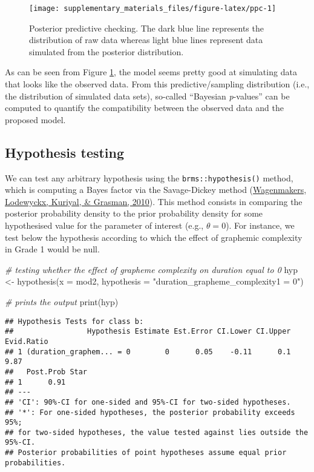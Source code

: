 \documentclass[
  11pt,
  english,
  ,doc,floatsintext]{apa6}
\newenvironment{Shaded}{}{}
\newcommand{\AttributeTok}[1]{\textcolor[rgb]{0.49,0.56,0.16}{#1}}
\newcommand{\CommentTok}[1]{\textcolor[rgb]{0.38,0.63,0.69}{\textit{#1}}}
\newcommand{\FunctionTok}[1]{\textcolor[rgb]{0.02,0.16,0.49}{#1}}
\newcommand{\NormalTok}[1]{#1}
\newcommand{\OtherTok}[1]{\textcolor[rgb]{0.00,0.44,0.13}{#1}}
\newcommand{\StringTok}[1]{\textcolor[rgb]{0.25,0.44,0.63}{#1}}
\begin{document}
\begin{figure}[!htb]

{\centering \texttt{[image: supplementary\_materials\_files/figure-latex/ppc-1]} 

}

\caption{Posterior predictive checking. The dark blue line represents the distribution of raw data whereas light blue lines represent data simulated from the posterior distribution.}\label{fig:ppc}
\end{figure}

As can be seen from Figure \ref{fig:ppc}, the model seems pretty good at simulating data that looks like the observed data. From this predictive/sampling distribution (i.e., the distribution of simulated data sets), so-called ``Bayesian \emph{p}-values'' can be computed to quantify the compatibility between the observed data and the proposed model.

\newpage

\hypertarget{hypothesis-testing}{%
\subsection{Hypothesis testing}\label{hypothesis-testing}}

We can test any arbitrary hypothesis using the \texttt{brms::hypothesis()} method, which is computing a Bayes factor via the Savage-Dickey method (\protect\hyperlink{ref-wagenmakers_bayesian_2010}{Wagenmakers, Lodewyckx, Kuriyal, \& Grasman, 2010}). This method consists in comparing the posterior probability density to the prior probability density for some hypothesised value for the parameter of interest (e.g., \(\theta = 0\)). For instance, we test below the hypothesis according to which the effect of graphemic complexity in Grade 1 would be null.

\begin{Shaded}
\begin{Highlighting}[]
\CommentTok{\# testing whether the effect of grapheme complexity on duration equal to 0}
\NormalTok{hyp }\OtherTok{\textless{}{-}} \FunctionTok{hypothesis}\NormalTok{(}\AttributeTok{x =}\NormalTok{ mod2, }\AttributeTok{hypothesis =} \StringTok{"duration\_grapheme\_complexity1 = 0"}\NormalTok{)}

\CommentTok{\# prints the output}
\FunctionTok{print}\NormalTok{(hyp)}
\end{Highlighting}
\end{Shaded}

\begin{verbatim}
## Hypothesis Tests for class b:
##                 Hypothesis Estimate Est.Error CI.Lower CI.Upper Evid.Ratio
## 1 (duration_graphem... = 0        0      0.05    -0.11      0.1       9.87
##   Post.Prob Star
## 1      0.91     
## ---
## 'CI': 90%-CI for one-sided and 95%-CI for two-sided hypotheses.
## '*': For one-sided hypotheses, the posterior probability exceeds 95%;
## for two-sided hypotheses, the value tested against lies outside the 95%-CI.
## Posterior probabilities of point hypotheses assume equal prior probabilities.
\end{verbatim}
\end{document}
